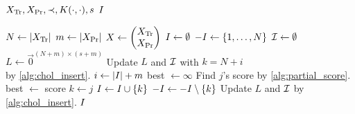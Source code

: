 \begin{algorithmic}[1]
  \REQUIRE \( X_{\text{Tr}}, X_{\text{Pr}}, \prec, K(\cdot, \cdot), s \)
  \ENSURE \( I \)

  \STATE \( N \gets \lvert X_{\text{Tr}}\rvert \)
  \STATE \( m \gets \lvert X_{\text{Pr}}\rvert \)
  \STATE \(
    X \gets
    \begin{pmatrix}
      X_{\text{Tr}} \\
      X_{\text{Pr}}
    \end{pmatrix}
  \)
  \STATE \( I \gets \emptyset \)
  \STATE \( -I \gets \{ 1, \dotsc, N \} \)
  \STATE \( \mathcal{I} \gets \emptyset \)
  \STATE \( L \gets \vec{0}^{(N + m) \times (s + m)} \)
    \STATE Update \( L \) and \( \mathcal{I} \) with
      \( k = N + i \) \\ by \cref{alg:chol_insert}.
  \ENDFOR
    \STATE \( i \gets \lvert I\rvert + m \)
    \STATE best \( \gets \infty \)
      \STATE Find \( j \)'s score by \cref{alg:partial_score}.
        \STATE best \( \gets \) score
        \STATE \( k \gets j \)
      \ENDIF
    \ENDFOR
    \STATE \( I \gets I \cup \{ k \} \)
    \STATE \( -I \gets -I \setminus \{ k \} \)
    \STATE Update \( L \) and \( \mathcal{I} \) by \cref{alg:chol_insert}.
  \ENDWHILE
  \RETURN \( I \)
\end{algorithmic}
